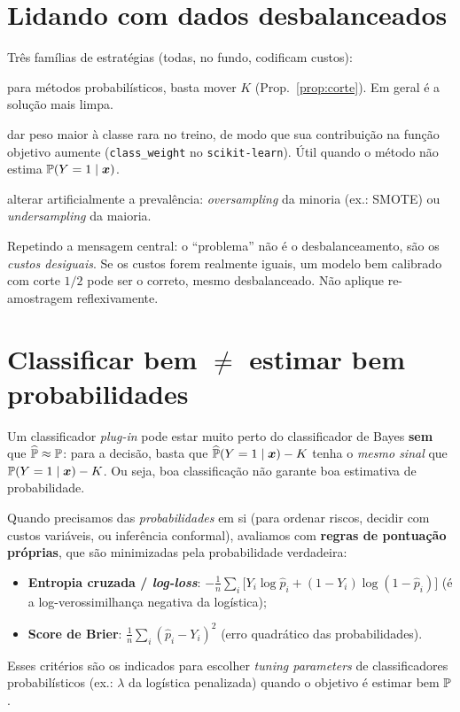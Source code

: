 \documentclass[11pt,a4paper]{article}
\begin{document}
\section{Lidando com dados desbalanceados}
Três famílias de estratégias (todas, no fundo, codificam custos):
\begin{description}[leftmargin=2.6cm,style=nextline]
  \item[Ajustar o corte] para métodos probabilísticos, basta mover $K$
        (Prop.~\ref{prop:corte}). Em geral é a solução mais limpa.
  \item[Reponderar observações] dar peso maior à classe rara no treino, de modo que
        sua contribuição na função objetivo aumente (\texttt{class\_weight} no
        \texttt{scikit-learn}). Útil quando o método não estima $\mathbb{P}(Y=1\mid\bm{x})$.
  \item[Re-amostrar] alterar artificialmente a prevalência: \emph{oversampling} da
        minoria (ex.: SMOTE) ou \emph{undersampling} da maioria.
\end{description}

\begin{atencao}
Repetindo a mensagem central: o ``problema'' não é o desbalanceamento, são os
\emph{custos desiguais}. Se os custos forem realmente iguais, um modelo bem
calibrado com corte $1/2$ pode ser o correto, mesmo desbalanceado. Não aplique
re-amostragem reflexivamente.
\end{atencao}

\section{Classificar bem $\neq$ estimar bem probabilidades}
Um classificador \emph{plug-in} pode estar muito perto do classificador de Bayes
\textbf{sem} que $\widehat{\mathbb{P}}\approx\mathbb{P}$: para a decisão, basta que
$\widehat{\mathbb{P}}(Y=1\mid\bm{x})-K$ tenha o \emph{mesmo sinal} que
$\mathbb{P}(Y=1\mid\bm{x})-K$. Ou seja, boa classificação não garante boa estimativa de
probabilidade.

Quando precisamos das \emph{probabilidades} em si (para ordenar riscos, decidir com
custos variáveis, ou inferência conformal), avaliamos com \textbf{regras de
pontuação próprias}, que são minimizadas pela probabilidade verdadeira:
\begin{itemize}[leftmargin=1.4cm,nosep]
  \item \textbf{Entropia cruzada / \emph{log-loss}}:
        $-\frac1n\sum_i\big[Y_i\log\widehat p_i + (1-Y_i)\log(1-\widehat p_i)\big]$
        (é a log-verossimilhança negativa da logística);
  \item \textbf{Score de Brier}:
        $\frac1n\sum_i (\widehat p_i - Y_i)^2$ (erro quadrático das
        probabilidades).
\end{itemize}
Esses critérios são os indicados para escolher \emph{tuning parameters} de
classificadores probabilísticos (ex.: $\lambda$ da logística penalizada) quando o
objetivo é estimar bem $\mathbb{P}$.
\end{document}
